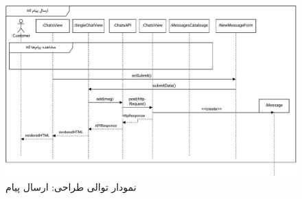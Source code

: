 \eject \pdfpagewidth=10in \pdfpageheight=9in
\begin{figure}[ht!]
	\centering
	\includegraphics[scale=0.8]{figs/design-sequence/3-48.pdf}
	\caption{نمودار توالی طراحی: ارسال پیام}
\end{figure}
\FloatBarrier
\newpage





\recalctypearea
\newpage
